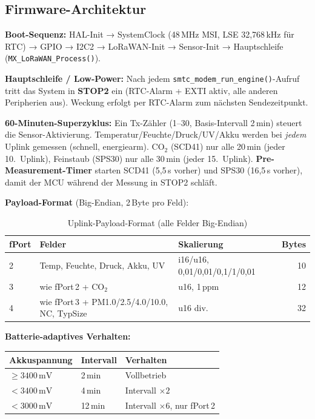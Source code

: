 \documentclass[11pt,a4paper]{scrartcl}
\begin{document}
\subsection*{Firmware-Architektur}

\textbf{Boot-Sequenz:} HAL-Init → SystemClock (48\,MHz MSI, LSE 32,768\,kHz für RTC) → GPIO → I2C2 → LoRaWAN-Init → Sensor-Init → Hauptschleife (\texttt{MX\_LoRaWAN\_Process()}).

\textbf{Hauptschleife / Low-Power:} Nach jedem \texttt{smtc\_modem\_run\_engine()}-Aufruf tritt das System in \textbf{STOP2} ein (RTC-Alarm + EXTI aktiv, alle anderen Peripherien aus). Weckung erfolgt per RTC-Alarm zum nächsten Sendezeitpunkt.

\textbf{60-Minuten-Superzyklus:} Ein Tx-Zähler (1–30, Basis-Intervall 2\,min) steuert die Sensor-Aktivierung. Temperatur/Feuchte/Druck/UV/Akku werden bei \textit{jedem} Uplink gemessen (schnell, energiearm). CO$_2$ (SCD41) nur alle 20\,min (jeder 10.~Uplink), Feinstaub (SPS30) nur alle 30\,min (jeder 15.~Uplink). \textbf{Pre-Measurement-Timer} starten SCD41 (5,5\,s vorher) und SPS30 (16,5\,s vorher), damit der MCU während der Messung in STOP2 schläft.

\textbf{Payload-Format} (Big-Endian, 2\,Byte pro Feld):

\begin{table}[H]
  \centering
  \small
  \begin{tabular}{lp{5.5cm}p{3.5cm}r}
    \hline
    \textbf{fPort} & \textbf{Felder} & \textbf{Skalierung} & \textbf{Bytes} \\
    \hline
    2 & Temp, Feuchte, Druck, Akku, UV & i16/u16, 0,01/0,01/0,1/1/0,01 & 10 \\
    3 & wie fPort\,2 + CO$_2$ & u16, 1\,ppm & 12 \\
    4 & wie fPort\,3 + PM1.0/2.5/4.0/10.0, NC, TypSize & u16 div. & 32 \\
    \hline
  \end{tabular}
  \caption{Uplink-Payload-Format (alle Felder Big-Endian)}
\end{table}

\textbf{Batterie-adaptives Verhalten:}

\begin{table}[H]
  \centering
  \begin{tabular}{lll}
    \hline
    \textbf{Akkuspannung} & \textbf{Intervall} & \textbf{Verhalten} \\
    \hline
    $\geq 3400\,\text{mV}$ & 2\,min & Vollbetrieb \\
    $< 3400\,\text{mV}$ & 4\,min & Intervall $\times2$ \\
    $< 3000\,\text{mV}$ & 12\,min & Intervall $\times6$, nur fPort\,2 \\
    \hline
  \end{tabular}
\end{table}
\end{document}
